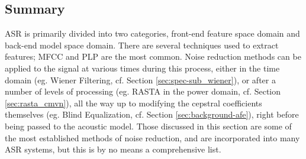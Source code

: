 % 

\subsection{Summary}
% 
ASR is primarily divided into two categories, front-end feature space domain and back-end model space domain.  There are several techniques used to extract features; MFCC and PLP are the most common. Noise reduction methods can be applied to the signal at various times during this process, either in the time domain (eg. Wiener Filtering, cf. Section \ref{sec:spec-sub_wiener}), or after a number of levels of processing (eg. RASTA in the power domain, cf. Section \ref{sec:rasta_cmvn}), all the way up to modifying the cepstral coefficients themselves (eg. Blind Equalization, cf. Section \ref{sec:background-afe}), right before being passed to the acoustic model.  Those discussed in this section are some of the most established methods of noise reduction, and are incorporated into many ASR systems, but this is by no means a comprehensive list.  

